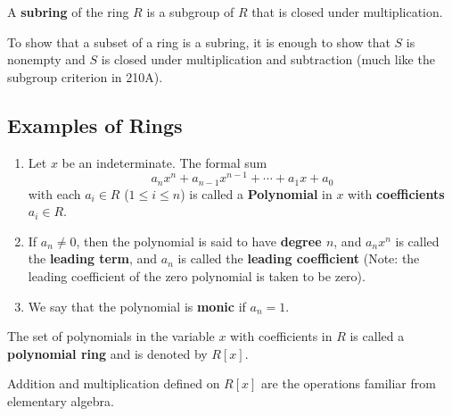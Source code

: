 \begin{definition}[Subring]
    A \textbf{subring} of the ring \( R  \) is a subgroup of \( R  \) that is closed under multiplication.
\end{definition}

To show that a subset of a ring is a subring, it is enough to show that \( S  \) is nonempty and \( S  \) is closed under multiplication and subtraction (much like the subgroup criterion in 210A).

\subsection{Examples of Rings}

\begin{definition}[Polynomials]
    \begin{enumerate}
        \item[(1)] Let \( x  \) be an indeterminate. The formal sum 
            \[  {a}_{n} x^{n} + {a}_{n-1} x^{n-1} + \cdots + {a}_{1} x + {a}_{0} \tag{\( n \geq 0  \)} \]
            with each \( {a}_{i} \in R  \) (\( 1 \leq i \leq n  \)) is called a \textbf{Polynomial} in \( x  \) with \textbf{coefficients} \( {a}_{i} \in R  \). 
        \item[(2)] If \( {a}_{n} \neq 0  \), then the polynomial is said to have \textbf{degree \( n \)}, and \( {a}_{n} x^{n} \) is called the \textbf{leading term}, and \( {a}_{n}  \) is called the \textbf{leading coefficient} (Note: the leading coefficient of the zero polynomial is taken to be zero).
        \item[(3)] We say that the polynomial is \textbf{monic} if \( {a}_{n} = 1  \).
    \end{enumerate}
\end{definition}

\begin{definition}
    The set of polynomials in the variable \( x  \) with coefficients in \( R  \) is called a \textbf{polynomial ring} and is denoted by \( R [x] \).
\end{definition}

Addition and multiplication defined on \( R[x] \) are the operations familiar from elementary algebra.

